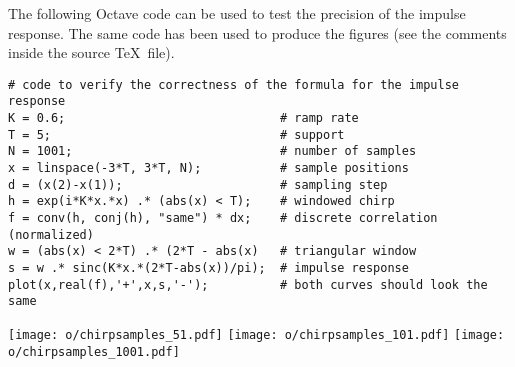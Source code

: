 \documentclass[a4paper]{article}           %
\newcommand{\1}{\mathbf{1}}
\begin{document}
The following Octave code can be used to test the precision of the impulse
response.  The same code has been used to produce the figures (see the
comments inside the source \TeX\ file).

\begin{verbatim}
# code to verify the correctness of the formula for the impulse response
K = 0.6;                              # ramp rate
T = 5;                                # support
N = 1001;                             # number of samples
x = linspace(-3*T, 3*T, N);           # sample positions
d = (x(2)-x(1));                      # sampling step
h = exp(i*K*x.*x) .* (abs(x) < T);    # windowed chirp
f = conv(h, conj(h), "same") * dx;    # discrete correlation (normalized)
w = (abs(x) < 2*T) .* (2*T - abs(x)   # triangular window
s = w .* sinc(K*x.*(2*T-abs(x))/pi);  # impulse response
plot(x,real(f),'+',x,s,'-');          # both curves should look the same
\end{verbatim}

\texttt{[image: o/chirpsamples\_51.pdf]}
\texttt{[image: o/chirpsamples\_101.pdf]}
\texttt{[image: o/chirpsamples\_1001.pdf]}
\end{document}
